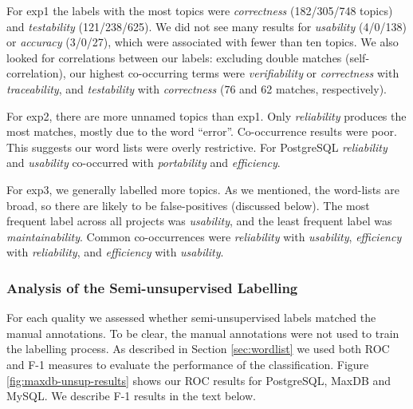 \documentclass[smallextended]{svjour3}       %
\begin{document}
\begin{table}
\end{table}

For \textsf{exp1} the labels with the most topics
were
\emph{correctness} (182/305/748 topics) and \emph{testability} (121/238/625). 
We did not see many results for \emph{usability} (4/0/138) or
\emph{accuracy} (3/0/27), which were associated with fewer than ten topics. 
We also looked for correlations between our labels: excluding double
matches (self-correlation), our highest co-occurring terms were
\emph{verifiability} or \emph{correctness}
with \emph{traceability}, and \emph{testability} with \emph{correctness} (76 and 62 matches, respectively).



For \textsf{exp2}, there are more unnamed topics than \textsf{exp1}. 
Only \emph{reliability} produces the most matches, mostly due to the word ``error''. 
Co-occurrence results were poor. This suggests our word lists were overly restrictive.
For PostgreSQL \emph{reliability} and  \emph{usability} co-occurred
with \emph{portability} and \emph{efficiency}.


For \textsf{exp3}, we generally labelled more topics. 
As we mentioned, the word-lists are broad, so there are likely to be false-positives (discussed below). 
The most frequent label across all projects was \emph{usability}, and the
least frequent label was \emph{maintainability}. 
Common co-occurrences were \emph{reliability} with \emph{usability}, \emph{efficiency} with \emph{reliability}, and \emph{efficiency} with \emph{usability}.




\subsubsection{Analysis of the Semi-unsupervised Labelling} %
For each quality we assessed whether semi-unsupervised labels matched the manual annotations. 
To be clear, the manual annotations were not used to
train the labelling process.
As described in Section \ref{sec:wordlist} we used both ROC and F-1 measures to evaluate the performance of the classification.
Figure \ref{fig:maxdb-unsup-results} shows our ROC results for PostgreSQL, MaxDB and MySQL. We describe F-1 results in the text below.
\end{document}

